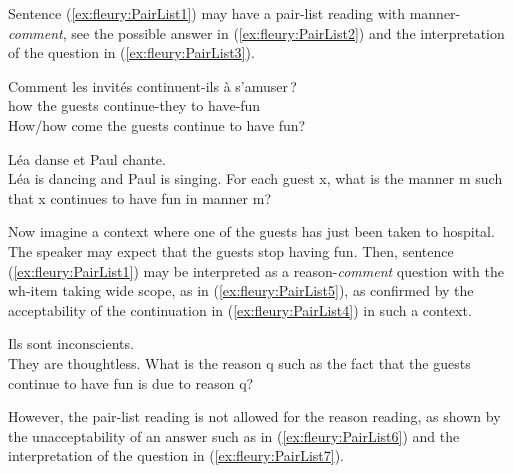 \documentclass[output=paper,colorlinks,citecolor=brown,
]{langscibook}
\begin{document}
Sentence (\ref{ex:fleury:PairList1}) may have a pair-list reading with manner-\textit{comment}, see the possible answer in (\ref{ex:fleury:PairList2}) and the interpretation of the question in (\ref{ex:fleury:PairList3}).

\begin{exe}
\ex \label{ex:fleury:PairList1} \gll Comment les invit\'es continuent-ils \`a s'amuser\,?\\
how the guests continue-they to have-fun\\
\glt How/how come the guests continue to have fun?
\begin{xlist}
\ex \label{ex:fleury:PairList2} L\'ea danse et Paul chante.\\
L\'ea is dancing and Paul is singing.
\ex \label{ex:fleury:PairList3} For each guest x, what is the manner m such that x continues to have fun in manner m?
\end{xlist}
\end{exe}

Now imagine a context where one of the guests has just been taken to hospital. The speaker may expect that the guests stop having fun. Then, sentence (\ref{ex:fleury:PairList1}) may be interpreted as a reason-\textit{comment} question with the wh-item taking wide scope,
 as in (\ref{ex:fleury:PairList5}),
as confirmed by the acceptability of the continuation in (\ref{ex:fleury:PairList4}) in such a context.

\begin{exe}
\ex 
\begin{xlist}
\ex \label{ex:fleury:PairList4} Ils sont inconscients.
\\They are thoughtless.
\ex \label{ex:fleury:PairList5} What is the reason q such as the fact that the guests continue to have fun is due to reason q?
\end{xlist}
\end{exe}

However, the pair-list reading is not allowed for the reason reading, as shown by the unacceptability of an answer such as in  (\ref{ex:fleury:PairList6}) and the interpretation of the question in (\ref{ex:fleury:PairList7}).

\begin{exe}
\ex 
\begin{xlist}
\end{xlist}
\end{exe}
\end{document}
